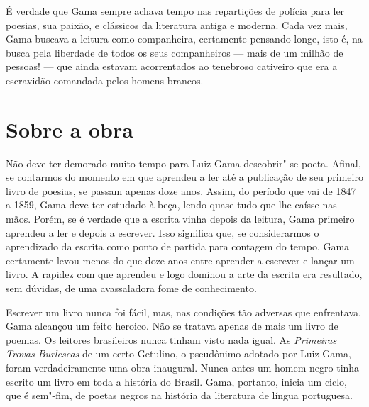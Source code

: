 É verdade que Gama sempre achava tempo nas repartições de polícia para
ler poesias, sua paixão, e clássicos da literatura antiga e moderna.
Cada vez mais, Gama buscava a leitura como companheira, certamente
pensando longe, isto é, na busca pela liberdade de todos os seus
companheiros --- mais de um milhão de pessoas! --- que ainda estavam
acorrentados ao tenebroso cativeiro que era a escravidão comandada pelos
homens brancos.

\section{Sobre a obra}

Não deve ter demorado muito tempo para Luiz Gama descobrir"-se poeta.
Afinal, se contarmos do momento em que aprendeu a ler até a publicação
de seu primeiro livro de poesias, se passam apenas doze anos. Assim, do
período que vai de 1847 a 1859, Gama deve ter estudado à beça, lendo
quase tudo que lhe caísse nas mãos. Porém, se é verdade que a escrita
vinha depois da leitura, Gama primeiro aprendeu a ler e depois a
escrever. Isso significa que, se considerarmos o aprendizado da escrita
como ponto de partida para contagem do tempo, Gama certamente levou
menos do que doze anos entre aprender a escrever e lançar um livro. A
rapidez com que aprendeu e logo dominou a arte da escrita era resultado,
sem dúvidas, de uma avassaladora fome de conhecimento.

Escrever um livro nunca foi fácil, mas, nas condições tão adversas que
enfrentava, Gama alcançou um feito heroico. Não se tratava apenas de
mais um livro de poemas. Os leitores brasileiros nunca tinham visto nada
igual. As \emph{Primeiras Trovas Burlescas} de um certo Getulino, o
pseudônimo adotado por Luiz Gama, foram verdadeiramente uma obra
inaugural. Nunca antes um homem negro tinha escrito um livro em toda a
história do Brasil. Gama, portanto, inicia um ciclo, que é sem"-fim, de
poetas negros na história da literatura de língua portuguesa.

